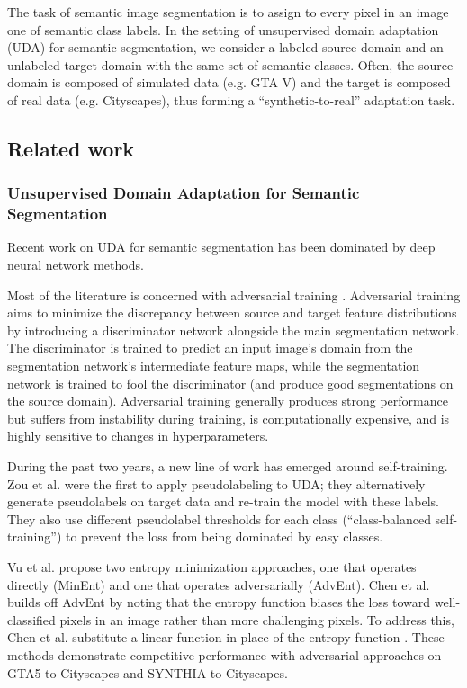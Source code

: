 \documentclass[final]{cvpr}
\begin{document}
The task of semantic image segmentation is to assign to every pixel in an image one of  semantic class labels. In the setting of unsupervised domain adaptation (UDA) for semantic segmentation, we consider a labeled source domain  and an unlabeled target domain  with the same set of semantic classes. Often, the source domain  is composed of simulated data (e.g. GTA V) and the target  is composed of real data (e.g. Cityscapes), thus forming a ``synthetic-to-real'' adaptation task. 



\subsection{Related work}
\subsubsection{Unsupervised Domain Adaptation for Semantic Segmentation}

Recent work on UDA for semantic segmentation has been dominated by deep neural network methods. 

Most of the literature is concerned with adversarial training \cite{cycada,adaptsegnet,advent,chen2018road}. Adversarial training aims to minimize the discrepancy between source and target feature distributions by introducing a discriminator network alongside the main segmentation network. The discriminator is trained to predict an input image's domain from the segmentation network's intermediate feature maps, while the segmentation network is trained to fool the discriminator (and produce good segmentations on the source domain). Adversarial training generally produces strong performance but suffers from instability during training, is computationally expensive, and is highly sensitive to changes in hyperparameters. 

During the past two years, a new line of work has emerged around self-training. Zou et al. \cite{cbst} were the first to apply pseudolabeling to UDA; they alternatively generate pseudolabels on target data and re-train the model with these labels. They also use different pseudolabel thresholds for each class (``class-balanced self-training'') to prevent the loss from being dominated by easy classes. 

Vu et al. \cite{advent} propose two entropy minimization approaches, one that operates directly (MinEnt) and one that operates adversarially (AdvEnt). Chen et al. \cite{maxsquare} builds off AdvEnt \cite{advent} by noting that the entropy function  biases the loss toward well-classified pixels in an image rather than more challenging pixels. To address this, Chen et al. \cite{maxsquare} substitute a linear function in place of the entropy function . These methods demonstrate competitive performance with adversarial approaches on GTA5-to-Cityscapes and SYNTHIA-to-Cityscapes. 
\end{document}
